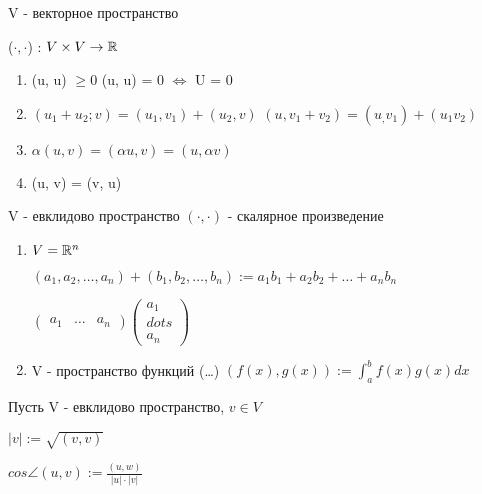 \begin{definition}
    V - векторное пространство

    ($\cdot, \cdot$) : $V \times V \to \mathbb{R}$

    \begin{enumerate}
        \item (u, u) $\geq 0$
        (u, u) = 0 $\Leftrightarrow$ U = 0

        \item $(u_1 + u_2; v) = (u_1, v_1) + (u_2, v)$
        $(u, v_1 + v_2) = (u_, v_1) + (u_1 v_2)$

        \item $\alpha(u, v) = (\alpha u, v) = (u, \alpha v)$
        \item (u, v) = (v, u)
    \end{enumerate}

    V - евклидово пространство
    $(\cdot, \cdot)$ - скалярное произведение
\end{definition}

\begin{eg}
    \begin{enumerate}
        \item $ V = \mathbb{R}^n $
        
        $(a_1, a_2, \ldots, a_n) + (b_1, b_2, \ldots, b_n) := a_1 b_1 + a_2 b_2 + \ldots + a_n b_n$

        
    $\left(
    \begin{array}{ccc}
        a_1 & \ldots & a_n
    \end{array}\right) \left(
                \begin{array}{c}
                    a_1\\
                    dots\\
                    a_n
                \end{array}
                \right)$

        \item V - пространство функций (\ldots) 
        $(f(x), g(x)) := \int_a^b f(x)g(x)dx$
    \end{enumerate}
\end{eg}

\begin{definition}
    Пусть V - евклидово пространство, $v \in V$
    
    $|v| := \sqrt{ (v, v) }$

    $cos\angle(u, v) := \frac{(u, w)}{|u| \cdot |v|}$



\end{definition}

